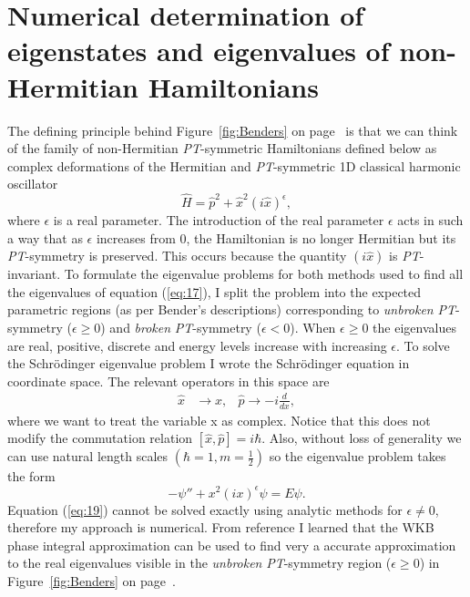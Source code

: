 \documentclass[10pt, a4paper, singlespacing]{report}
\newcommand\PT{\emph{PT}}
\begin{document}
\chapter{Numerical determination of eigenstates and eigenvalues of non-Hermitian Hamiltonians}\label{Benders}
The defining principle behind Figure~\ref{fig:Benders} on page~\pageref{fig:Benders} is that we can think of the family of non-Hermitian \PT-symmetric Hamiltonians defined below as complex deformations of the Hermitian and \PT-symmetric 1D classical harmonic oscillator
\begin{equation}\label{eq:17}
\hat{H} = \hat{p}^2 + \hat{x}^2 (i \hat{x})^{\epsilon},
\end{equation}
where $\epsilon$ is a real parameter. The introduction of the real parameter $\epsilon$ acts in such a way that as $\epsilon$ increases from $0$, the Hamiltonian is no longer Hermitian but its \PT-symmetry is preserved. This occurs because the quantity $(i\hat{x})$ is \PT-invariant\cite{BenderPT}\cite{Bender}.
To formulate the eigenvalue problems for both methods used to find all the eigenvalues of equation (\ref{eq:17}), I split the problem into the expected parametric regions (as per Bender's descriptions) corresponding to \emph{unbroken} \PT-symmetry ($\epsilon \geq 0$) and \emph{broken} \PT-symmetry ($\epsilon < 0$).
When $\epsilon \geq 0$ the eigenvalues are real, positive, discrete and energy levels increase with increasing $\epsilon$.
To solve the Schrödinger eigenvalue problem I wrote the Schrödinger equation in coordinate space. The relevant operators in this space are
\begin{align} \label{eq:18}
\hat{x}& \rightarrow x, &\hat{p}\rightarrow -i \frac{d}{dx},
\end{align}
where we want to treat the variable x as complex. Notice that this does not modify the commutation relation $[\hat{x}, \hat{p}] = i\hbar$. Also, without loss of generality we can use natural length scales $(\hbar = 1, m = \frac{1}{2})$ so the eigenvalue problem takes the form
\begin{equation}\label{eq:19}
-\psi'' + x^2 (i x)^{\epsilon} \psi = E \psi.
\end{equation}
Equation (\ref{eq:19}) cannot be solved exactly using analytic methods for $\epsilon \neq 0$, therefore my approach is numerical. From reference \cite{Bender} I learned that the WKB phase integral approximation can be used to find very a accurate approximation to the real eigenvalues visible in the \emph{unbroken} \PT-symmetry region ($\epsilon \geq 0$) in Figure~\ref{fig:Benders} on page~\pageref{fig:Benders}. 
\end{document}
